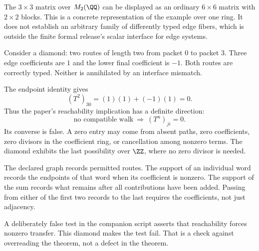 The $3\times3$ matrix over $M_2(\QQ)$ can be displayed as an ordinary $6\times6$ matrix with $2\times2$ blocks. This is a concrete representation of the example over one ring. It does not establish an arbitrary family of differently typed edge fibers, which is outside the finite formal release's scalar interface for edge systems.


Consider a diamond: two routes of length two from packet $0$ to packet $3$. Three edge coefficients are $1$ and the lower final coefficient is $-1$. Both routes are correctly typed. Neither is annihilated by an interface mismatch.


The endpoint identity gives
\[
(T^2)_{30}=(1)(1)+(-1)(1)=0.
\]
Thus the paper's reachability implication has a definite direction:
\[
\text{no compatible walk}\ \Longrightarrow\ (T^n)_{ji}=0.
\]
Its converse is false. A zero entry may come from absent paths, zero coefficients, zero divisors in the coefficient ring, or cancellation among nonzero terms. The diamond exhibits the last possibility over $\ZZ$, where no zero divisor is needed.

The declared graph records permitted routes. The support of an individual word records the endpoints of that word when its coefficient is nonzero. The support of the sum records what remains after all contributions have been added. Passing from either of the first two records to the last requires the coefficients, not just adjacency.

A deliberately false test in the companion script asserts that reachability forces nonzero transfer. This diamond makes the test fail. That is a check against overreading the theorem, not a defect in the theorem.



